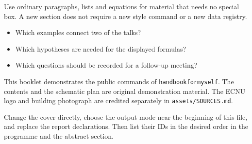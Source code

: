 \documentclass[a4paper,11pt,twoside]{article}
\begin{document}
Use ordinary paragraphs, lists and equations for material that needs no special
box. A new section does not require a new style command or a new data registry.

\begin{itemize}
  \item Which examples connect two of the talks?
  \item Which hypotheses are needed for the displayed formulas?
  \item Which questions should be recorded for a follow-up meeting?
\end{itemize}

This booklet demonstrates the public commands of \texttt{handbookformyself}.
The contents and the schematic plan are original demonstration material.
The ECNU logo and building photograph are credited separately in
\texttt{assets/SOURCES.md}.

\begin{noticebox}
  Change the cover directly, choose the output mode near the beginning of this
  file, and replace the report declarations. Then list their IDs in the desired
  order in the programme and the abstract section.
\end{noticebox}
\end{document}
